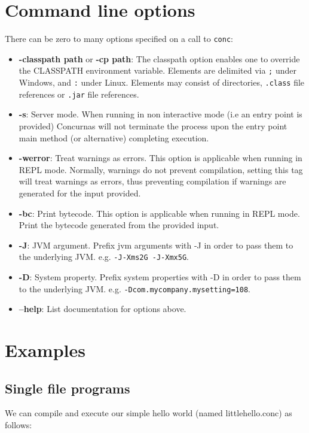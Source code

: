 \documentclass[conc-doc]{subfiles}
\begin{document}
\section{Command line options}
\label{sec:cmdlineparams}
There can be zero to many options specified on a call to \lstinline{conc}:
\begin{itemize}
	\item \textbf{-classpath path} or \textbf{-cp path}: The classpath option enables one to override the CLASSPATH environment variable. Elements are delimited via \lstinline{;} under Windows, and \lstinline{:} under Linux. Elements may consist of directories, \lstinline{.class} file references or \lstinline{.jar} file references.
	\item \textbf{-s}: Server mode. When running in non interactive mode (i.e an entry point is provided) Concurnas will not terminate the process upon the entry point main method (or alternative) completing execution.
	\item \textbf{-werror}: Treat warnings as errors. This option is applicable when running in REPL mode. Normally, warnings do not prevent compilation, setting this tag will treat warnings as errors, thus preventing compilation if warnings are generated for the input provided.
	\item \textbf{-bc}: Print bytecode. This option is applicable when running in REPL mode. Print the bytecode generated from the provided input.
	\item \textbf{-J}: JVM argument. Prefix jvm arguments with -J in order to pass them to the underlying JVM. e.g. \lstinline{-J-Xms2G -J-Xmx5G}.
	\item \textbf{-D}: System property. Prefix system properties with -D in order to pass them to the underlying JVM. e.g. \lstinline{-Dcom.mycompany.mysetting=108}.
	\item \textbf{--help}: List documentation for options above.
\end{itemize}



\section{Examples}
\subsection{Single file programs}
We can compile and execute our simple hello world (named littlehello.conc) as follows:
\end{document}
